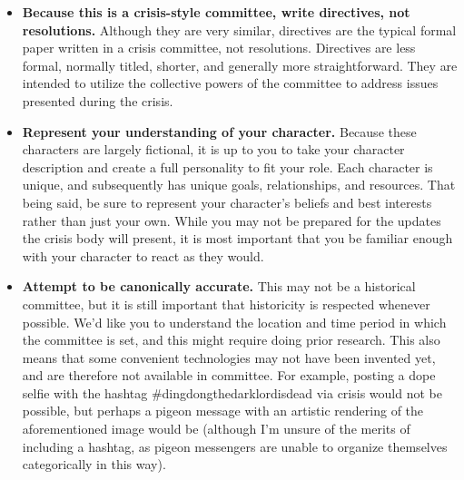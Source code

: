 \documentclass[10pt, letterpaper]{article}
\begin{document}
\begin{itemize}
            \item {\textbf{Because this is a crisis-style committee, write directives, not resolutions.} Although they are very similar, directives are the typical formal paper written in a crisis committee, not resolutions. Directives are less formal, normally titled, shorter, and generally more straightforward. They are intended to utilize the collective powers of the committee to address issues presented during the crisis.}
            
            \item {\textbf{Represent your understanding of your character.} Because these characters are largely fictional, it is up to you to take your character description and create a full personality to fit your role. Each character is unique, and subsequently has unique goals, relationships, and resources. That being said, be sure to represent your character’s beliefs and best interests rather than just your own. While you may not be prepared for the updates the crisis body will present, it is most important that you be familiar enough with your character to react as they would. }
            
            \item {\textbf{Attempt to be canonically accurate.} This may not be a historical committee, but it is still important that historicity is respected whenever possible. We’d like you to understand the location and time period in which the committee is set, and this might require doing prior research. This also means that some convenient technologies may not have been invented yet, and are therefore not available in committee. For example, posting a dope selfie with the hashtag \#dingdongthedarklordisdead via crisis would not be possible, but perhaps a pigeon message with an artistic rendering of the aforementioned image would be (although I’m unsure of the merits of including a hashtag, as pigeon messengers are unable to organize themselves categorically in this way).}
                \end{itemize}
    
            \newpage
\end{document}
